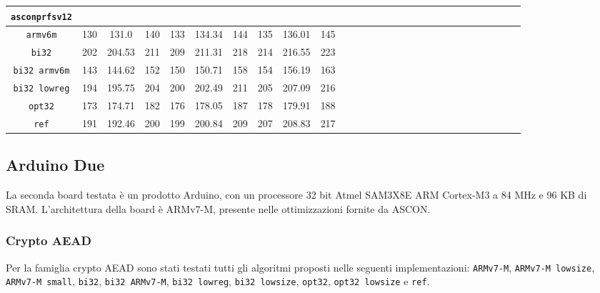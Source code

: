 \begin{landscape}
\begin{table}[]
\begin{adjustbox}{width=600pt}
\begin{tabular}{|c|c|c|c|c|c|c|c|c|c|c|c|c|c|c|c|c|c|c|c|c|c|c|c|c|c|c|c|}
                \texttt{\textbf{asconprfsv12}} & & & & & & & & & & & & & & & & & & & & & & & & & & & \\
				\hline
				\texttt{armv6m} & 130 & 131.0 & 140 & 133 & 134.34 & 144 & 135 & 136.01 & 145 & & & & & & & & & & & & & & & & & &\\
				\hline
				\texttt{bi32} & 202 & 204.53 & 211 & 209 & 211.31 & 218 & 214 & 216.55 & 223 & & & & & & & & & & & & & & & & & & \\
				\hline
				\texttt{bi32 armv6m} & 143 & 144.62 & 152 & 150 & 150.71 & 158 & 154 & 156.19 & 163 & & & & & & & & & & & & & & & & & & \\
				\hline
				\texttt{bi32 lowreg} & 194 & 195.75 & 204 & 200 & 202.49 & 211 & 205 & 207.09 & 216 & & & & & & & & & & & & & & & & & & \\
				\hline
				\texttt{opt32} & 173 & 174.71 & 182 & 176 & 178.05 & 187 & 178 & 179.91 & 188 & & & & & & & & & & & & & & & & & & \\
				\hline
				\texttt{ref} & 191 & 192.46 & 200 & 199 & 200.84 & 209 & 207 & 208.83 & 217 & & & & & & & & & & & & & & & & & & \\
				\hline
			\end{tabular}
		\end{adjustbox}
	\end{table}
\end{landscape}

\subsection{Arduino Due}

La seconda board testata è un prodotto Arduino, con un processore 32 bit Atmel SAM3X8E ARM Cortex-M3 a 84 MHz e 96 KB di SRAM\cite{arduino}. L'architettura della board è ARMv7-M, presente nelle ottimizzazioni fornite da ASCON\cite{arm}.

\subsubsection{Crypto AEAD}

Per la famiglia crypto AEAD sono stati testati tutti gli algoritmi proposti nelle seguenti implementazioni: \texttt{ARMv7-M}, \texttt{ARMv7-M lowsize}, \texttt{ARMv7-M small}, \texttt{bi32}, \texttt{bi32 ARMv7-M}, \texttt{bi32 lowreg}, \texttt{bi32 lowsize}, \texttt{opt32}, \texttt{opt32 lowsize} e \texttt{ref}.

